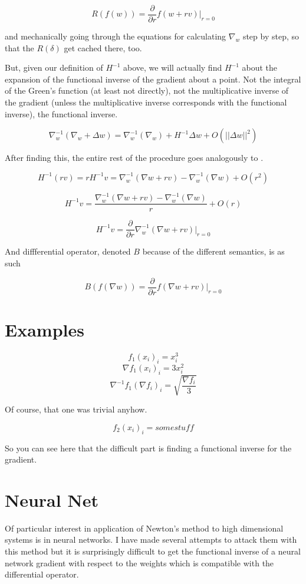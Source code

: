 \documentclass{article}
\begin{document}
$$R(f(w)) = \frac{\partial}{\partial r} f(w + rv)|_{r=0}$$

and mechanically going through the equations for calculating $\nabla_w$ step by step, so that the $R(\delta)$ get cached there, too.

But, given our definition of $H^{-1}$ above, we will actually find $H^{-1}$ about the expansion of the functional inverse of the gradient about a point. Not the integral of the Green's function (at least not directly), not the multiplicative inverse of the gradient (unless the multiplicative inverse corresponds with the functional inverse), the functional inverse.

$$\nabla_w^{-1} (\nabla_w + \Delta w) = \nabla_w^{-1} (\nabla_w) + H^{-1} \Delta w + O(||\Delta w||^2)$$

After finding this, the entire rest of the procedure goes analogously to \cite{pearlmutter1994}.

$$H^{-1}(rv) = rH^{-1}v = \nabla_w^{-1}(\nabla w + rv) - \nabla_w^{-1}(\nabla w) + O(r^2)$$

$$H^{-1}v = \frac{\nabla_w^{-1}(\nabla w + rv) - \nabla_w^{-1}(\nabla w)}{r} + O(r)$$

$$H^{-1}v = \frac{\partial}{\partial r} \nabla_w^{-1} (\nabla w + rv) |_{r=0}$$

And diffferential operator, denoted $B$ because of the different semantics, is as such

$$B(f(\nabla w)) = \frac{\partial}{\partial r} f(\nabla w + rv)|_{r=0}$$

\section{Examples}

$$ f_1(x_i)_i = x_i^3 $$
$$ \nabla f_1(x_i)_i = 3 x_i^2 $$
$$ \nabla^{-1} f_1(\nabla f_i)_i = \sqrt{\frac{\nabla f_i}{3}} $$


Of course, that one was trivial anyhow.

$$ f_2(x_i)_i = some stuff $$


So you can see here that the difficult part is finding a functional inverse for the gradient.

\section{Neural Net}

Of particular interest in application of Newton's method to high dimensional systems is in neural networks. I have made several attempts to attack them with this method but it is surprisingly difficult to get the functional inverse of a neural network gradient with respect to the weights which is compatible with the differential operator.
\end{document}
